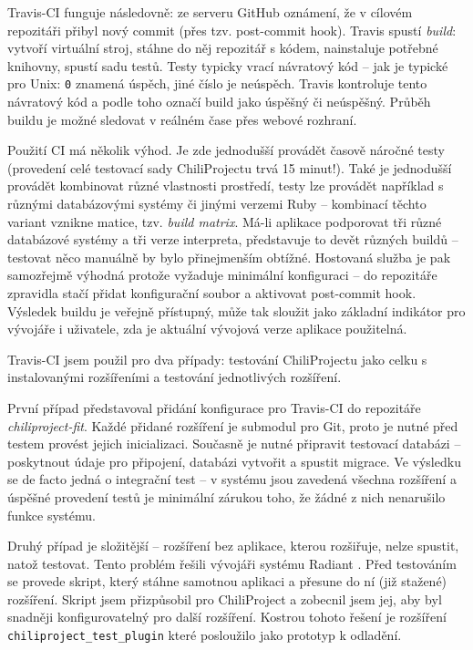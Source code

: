 \documentclass[thesis=B,czech]{FITthesis}[2012/05/02]
\begin{document}
Travis-CI funguje následovně: ze serveru GitHub oznámení, že v cílovém
repozitáři přibyl nový \gls{commit} (přes tzv. post-commit hook). Travis
spustí \emph{build}: vytvoří virtuální stroj, stáhne do něj repozitář
s kódem, nainstaluje potřebné knihovny, spustí sadu testů. Testy typicky
vrací návratový kód -- jak je typické pro Unix: \lstinline!0! znamená
úspěch, jiné číslo je neúspěch. Travis kontroluje tento návratový kód a
podle toho označí build jako úspěšný či neúspěšný. Průběh buildu je
možné sledovat v reálném čase přes webové rozhraní.

Použití \gls{CI} má několik výhod. Je zde jednodušší provádět časově
náročné testy (provedení celé testovací sady ChiliProjectu trvá 15
minut!). Také je jednodušší provádět kombinovat různé vlastnosti
prostředí, testy lze provádět například s různými databázovými systémy
či jinými verzemi Ruby -- kombinací těchto variant vznikne matice, tzv.
\emph{build matrix}. Má-li aplikace podporovat tři různé databázové systémy
a tři verze interpreta, představuje to devět různých buildů -- testovat
něco manuálně by bylo přinejmenším obtížné. Hostovaná služba je pak
samozřejmě výhodná protože vyžaduje minimální konfiguraci -- do
repozitáře zpravidla stačí přidat konfigurační soubor a aktivovat
post-commit hook. Výsledek buildu je veřejně přístupný, může tak sloužit
jako základní indikátor pro vývojáře i uživatele, zda je aktuální
vývojová verze aplikace použitelná.

Travis-CI jsem použil pro dva případy: testování ChiliProjectu jako
celku s instalovanými rozšířeními a testování jednotlivých
rozšíření.

První případ představoval přidání konfigurace pro Travis-CI do
repozitáře \emph{chiliproject-fit}. Každé přidané rozšíření je
\gls{submodul} pro Git, proto je nutné před testem provést jejich
inicializaci. Současně je nutné připravit testovací databázi --
poskytnout údaje pro připojení, databázi vytvořit a spustit migrace. Ve
výsledku se de facto jedná o integrační test -- v systému jsou zavedená
všechna rozšíření a úspěšné provedení testů je minimální zárukou toho,
že žádné z nich nenarušilo funkce systému.

Druhý případ je složitější -- rozšíření bez aplikace, kterou rozšiřuje,
nelze spustit, natož testovat. Tento problém řešili vývojáři systému
Radiant \citep{Muhl2012}. Před testováním se provede skript, který
stáhne samotnou aplikaci a přesune do ní (již stažené) rozšíření. Skript
jsem přizpůsobil pro ChiliProject a zobecnil jsem jej, aby byl snadněji
konfigurovatelný pro další rozšíření. Kostrou tohoto řešení je rozšíření
\lstinline!chiliproject_test_plugin! které posloužilo jako prototyp
k odladění.
\end{document}
